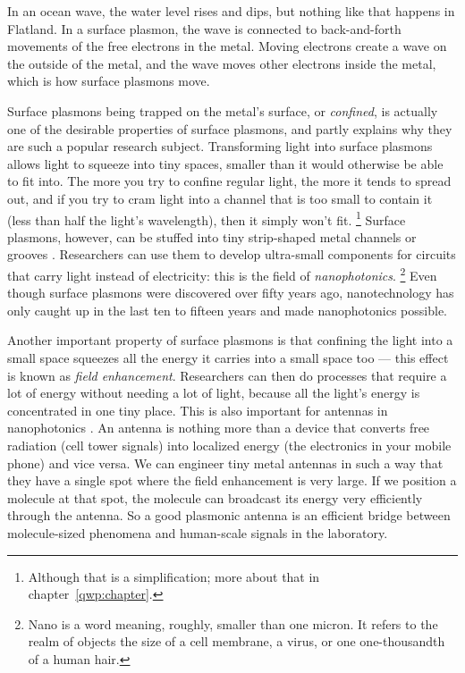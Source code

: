 In an ocean wave, the water level rises and dips, but nothing like that happens in Flatland.
In a surface plasmon, the wave is connected to back-and-forth movements of the free electrons in the metal.
Moving electrons create a wave on the outside of the metal, and the wave moves other electrons inside the metal, which is how surface plasmons move.

Surface plasmons being trapped on the metal's surface, or \emph{confined}, is actually one of the desirable properties of surface plasmons, and partly explains why they are such a popular research subject.
Transforming light into surface plasmons allows light to squeeze into tiny spaces, smaller than it would otherwise be able to fit into.
The more you try to confine regular light, the more it tends to spread out, and if you try to cram light into a channel that is too small to contain it (less than half the light's wavelength), then it simply won't fit.%
\footnote{Although that is a simplification; more about that in chapter~\ref{qwp:chapter}.}
Surface plasmons, however, can be stuffed into tiny strip-shaped metal channels \cite{Maier2005} or grooves \cite{GarciaVidal2006}.
Researchers can use them to develop ultra-small components for circuits that carry light instead of electricity: this is the field of \emph{nanophotonics}.%
\footnote{Nano is a word meaning, roughly, smaller than one micron.
It refers to the realm of objects the size of a cell membrane, a virus, or one one-thousandth of a human hair.}
Even though surface plasmons were discovered over fifty years ago, nanotechnology has only caught up in the last ten to fifteen years and made nanophotonics possible.

Another important property of surface plasmons is that confining the light into a small space squeezes all the energy it carries into a small space too --- this effect is known as \emph{field enhancement}.
Researchers can then do processes that require a lot of energy without needing a lot of light, because all the light's energy is concentrated in one tiny place.
This is also important for antennas in nanophotonics \cite{Novotny2011a}.
An antenna is nothing more than a device that converts free radiation (cell tower signals) into localized energy (the electronics in your mobile phone) and vice versa.
We can engineer tiny metal antennas in such a way that they have a single spot where the field enhancement is very large.
If we position a molecule at that spot, the molecule can broadcast its energy very efficiently through the antenna.
So a good plasmonic antenna is an efficient bridge between molecule-sized phenomena and human-scale signals in the laboratory.

